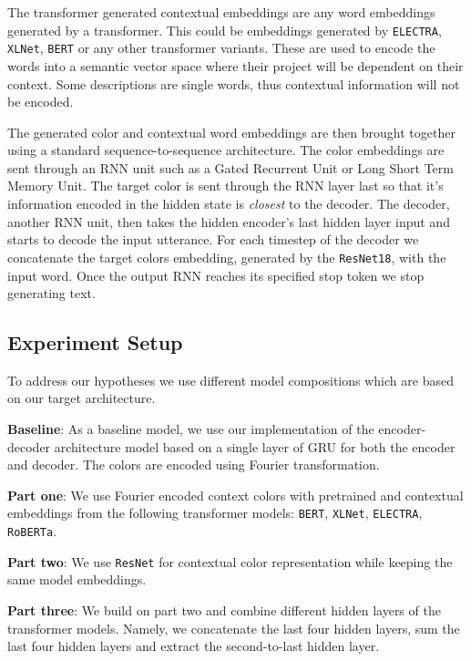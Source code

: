 \par
The transformer generated contextual embeddings are any word embeddings generated by a transformer. This could be embeddings generated by \texttt{ELECTRA}, \texttt{XLNet}, \texttt{BERT} or any other transformer variants. These are used to encode the words into a semantic vector space where their project will be dependent on their context. Some descriptions are single words, thus contextual information will not be encoded.

\par
The generated color and contextual word embeddings are then brought together using a standard sequence-to-sequence architecture. The color embeddings are sent through an RNN unit such as a Gated Recurrent Unit or Long Short Term Memory Unit. The target color is sent through the RNN layer last so that it’s information encoded in the hidden state is \emph{closest} to the decoder. The decoder, another RNN unit,  then takes the hidden encoder's last hidden layer input and starts to decode the input utterance. For each timestep of the decoder we concatenate the target colors embedding, generated by the \texttt{ResNet18}, with the input word. Once the output RNN reaches its specified stop token we stop generating text.

\subsection{Experiment Setup}
To address our hypotheses we use different model compositions which are based on our target architecture.

\textbf{Baseline}:
As a baseline model, we use our implementation of the encoder-decoder architecture model based on a single layer of GRU for both the encoder and decoder. The colors are encoded using Fourier transformation.

\textbf{Part one}:
We use Fourier encoded context colors with pretrained and contextual embeddings from the following transformer models: \texttt{BERT}, \texttt{XLNet}, \texttt{ELECTRA}, \texttt{RoBERTa}.

\textbf{Part two}:
We use \texttt{ResNet} for contextual color representation while keeping the same model embeddings.

\textbf{Part three}:
We build on part two and combine different hidden layers of the transformer models. Namely, we concatenate the last four hidden layers, sum the last four hidden layers and extract the second-to-last hidden layer.